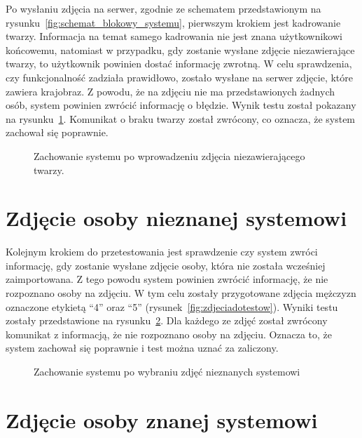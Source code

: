 Po wysłaniu zdjęcia na serwer, zgodnie ze schematem przedstawionym na rysunku~\ref{fig:schemat_blokowy_systemu},
pierwszym krokiem jest kadrowanie twarzy.
Informacja na temat samego kadrowania nie jest znana użytkownikowi końcowemu, natomiast w przypadku,
gdy zostanie wysłane zdjęcie niezawierające twarzy, to użytkownik powinien dostać informację zwrotną.
W celu sprawdzenia, czy funkcjonalność zadziała prawidłowo, zostało wysłane na serwer zdjęcie, które zawiera krajobraz.
Z powodu, że na zdjęciu nie ma przedstawionych żadnych osób, system powinien zwrócić informację o błędzie.
Wynik testu został pokazany na rysunku~\ref{fig:wprowadzona_natura}.
Komunikat o braku twarzy został zwrócony, co oznacza, że system zachował się poprawnie.

\begin{figure}[H]
    \centering
    \caption{ Zachowanie systemu po wprowadzeniu zdjęcia niezawierającego twarzy. }
    \customsource
    \label{fig:wprowadzona_natura}
\end{figure}


\section{Zdjęcie osoby nieznanej systemowi}

Kolejnym krokiem do przetestowania jest sprawdzenie czy system zwróci informację,
gdy zostanie wysłane zdjęcie osoby, która nie została wcześniej zaimportowana.
Z tego powodu system powinien zwrócić informację, że nie rozpoznano osoby na zdjęciu.
W tym celu zostały przygotowane zdjęcia mężczyzn oznaczone etykietą ``4'' oraz ``5'' (rysunek~\ref{fig:zdjeciadotestow}).
Wyniki testu zostały przedstawione na rysunku~\ref{fig:rezultat_nieznane}.
Dla każdego ze zdjęć został zwrócony komunikat z informacją, że nie rozpoznano osoby na zdjęciu.
Oznacza to, że system zachował się poprawnie i test można uznać za zaliczony.

\begin{figure}[]
    \centering
    \caption{ Zachowanie systemu po wybraniu zdjęć nieznanych systemowi }
    \customsource
    \label{fig:rezultat_nieznane}
\end{figure}


\section{Zdjęcie osoby znanej systemowi}

